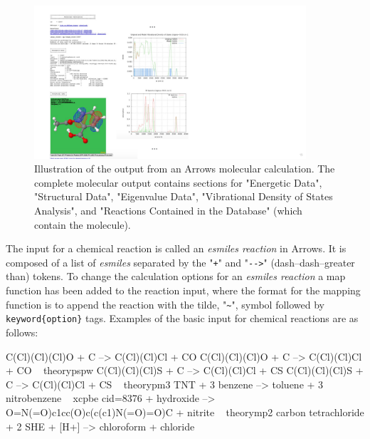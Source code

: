 \documentclass[runningheads,a4paper]{llncs}
\begin{document}
\begin{figure}[!h]
   \centering
   \includegraphics[width=0.9\textwidth]{images/arrows_output2.pdf}
   \caption{Illustration of the output from an Arrows molecular calculation.  The complete molecular output contains sections for "Energetic Data", "Structural Data", "Eigenvalue Data", "Vibrational Density of States Analysis", and "Reactions Contained in the Database" (which contain the molecule). }
   \label{fig.arrows.output}
\end{figure}

\newpage
The input for a chemical reaction is called an \textit{esmiles reaction} in Arrows.  It is composed of a list of \textit{esmiles} separated by the "\verb|+|" and "\verb|-->|" (dash--dash--greater than) tokens.
To change the calculation options  for an \textit{esmiles reaction} 
 a map function has been added to the reaction input, where the format for the mapping function is to append the reaction with the tilde, "\verb|~|", symbol followed by \verb|keyword{option}| tags.
 Examples of the basic input for chemical reactions are as follows:

\small
\begin{center}
\begin{boxedverbatim}
C(Cl)(Cl)(Cl)O + C  --> C(Cl)(Cl)Cl + CO  
C(Cl)(Cl)(Cl)O + C  --> C(Cl)(Cl)Cl + CO ~ theory{pspw}
C(Cl)(Cl)(Cl)S + C  --> C(Cl)(Cl)Cl + CS
C(Cl)(Cl)(Cl)S + C  --> C(Cl)(Cl)Cl + CS ~ theory{pm3} 
TNT + 3 benzene --> toluene + 3 nitrobenzene ~ xc{pbe} 
cid=8376 + hydroxide --> O=N(=O)c1cc(O)c(c(c1)N(=O)=O)C + nitrite ~ theory{mp2}
carbon tetrachloride + 2 SHE + [H+]  -->  chloroform + chloride 
\end{boxedverbatim}
\end{center}
\normalsize
\end{document}
